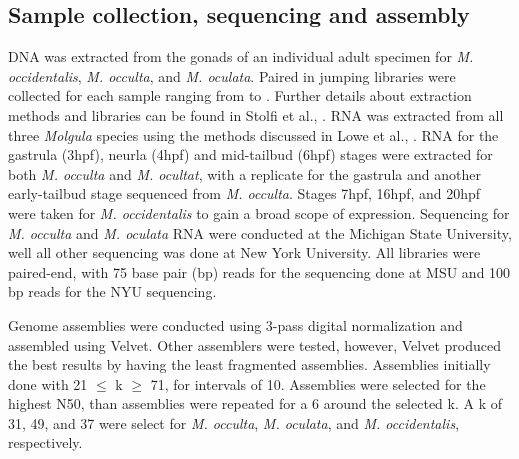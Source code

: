 \subsection{Sample collection, sequencing and assembly}
DNA was extracted from the gonads of an individual adult specimen for \textit{M. occidentalis}, \textit{M. occulta}, and \textit{M. oculata}. Paired in jumping libraries were collected for each sample ranging from  to . Further details about extraction methods and libraries can be found in Stolfi et al., \cite{stolfi_divergent_2014}. RNA was extracted from all three \textit{Molgula} species using the methods discussed in Lowe et al., \cite{}. RNA for the gastrula (3hpf), neurla (4hpf) and mid-tailbud (6hpf) stages were extracted for both \textit{M. occulta} and \textit{M. ocultat}, with a replicate for the gastrula and another early-tailbud stage sequenced from \textit{M. occulta}. Stages 7hpf, 16hpf, and 20hpf were taken for \textit{M. occidentalis} to gain a broad scope of expression. Sequencing for \textit{M. occulta} and \textit{M. oculata} RNA were conducted at the Michigan State University, well all other sequencing was done at New York University. All libraries were paired-end, with 75 base pair (bp) reads for the sequencing done at MSU and 100 bp reads for the NYU sequencing. 

Genome assemblies were conducted using 3-pass digital normalization \cite{brown_reference-free_2012} and assembled using Velvet\cite{zerbino_velvet:_2008}. Other assemblers were tested, however, Velvet produced the best results by having the least fragmented assemblies. Assemblies initially done with 21 $\leq$ k $\geq$ 71, for intervals of 10. Assemblies were selected for the highest N50, than assemblies were repeated for a 6 around the selected k. A k of 31, 49, and 37 were select for \textit{M. occulta}, \textit{M. oculata}, and \textit{M. occidentalis}, respectively. 

